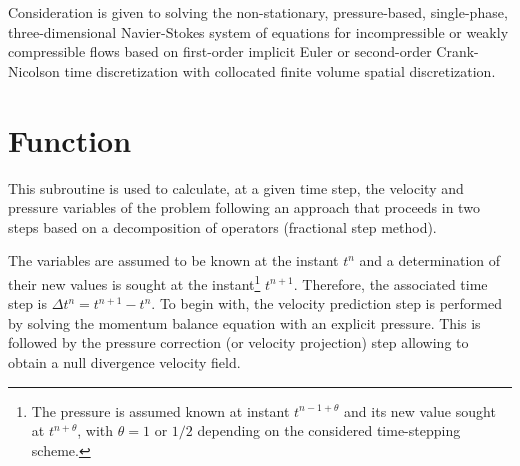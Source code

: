 
%
%
%
%


\label{ap:navstv}

Consideration is given to solving the non-stationary, pressure-based,
single-phase, three-dimensional Navier-Stokes system of equations for
incompressible or weakly compressible flows based on first-order implicit
Euler or second-order Crank-Nicolson time discretization with collocated
finite volume spatial discretization.


\section*{Function}

This subroutine is used to calculate, at a given time step, the velocity
 and pressure variables of the problem following an approach that proceeds
 in two steps based on a decomposition of operators (fractional step method).

The variables are assumed to be known at the instant ${t^n}$ and a
determination of their new values is sought at the
instant\footnote{The pressure is assumed known at instant $t^{n-1+\theta}$
and its new value sought at $t^{n+\theta}$, with $\theta=1$ or $1/2$
depending on the considered time-stepping scheme.} ${t^{n+1}}$.
Therefore, the associated time step is ${\Delta {t^n} ={t^{n+1}- {t^n}}}$.
To begin with, the velocity prediction step is performed by solving the
momentum balance equation with an explicit pressure. This is followed by
the pressure correction (or velocity projection) step allowing to obtain
a null divergence velocity field.

